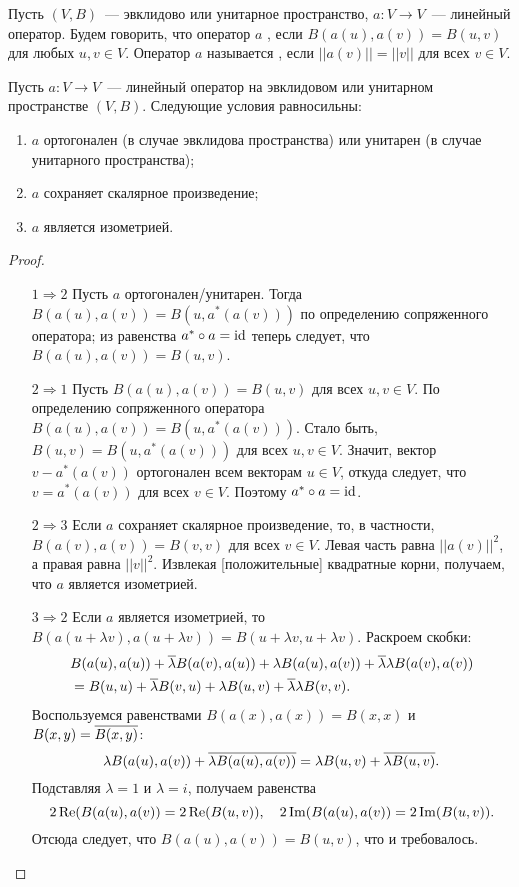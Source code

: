 \begin{definition}
Пусть $(V,B)$~--- эвклидово или унитарное пространство,
$a\colon V\to V$~--- линейный оператор.
Будем говорить, что оператор $a$ ,
если $B(a(u),a(v))=B(u,v)$ для любых $u,v\in V$.
Оператор $a$ называется , если
$||a(v)|| = ||v||$ для всех $v\in V$.
\end{definition}

\begin{lemma}\label{lem:isometry_equiv}
Пусть $a\colon V\to V$~--- линейный оператор на эвклидовом или
унитарном пространстве $(V,B)$. Следующие условия равносильны:
\begin{enumerate}
\item $a$ ортогонален (в случае эвклидова пространства) или унитарен
  (в случае унитарного пространства);
\item $a$ сохраняет скалярное произведение;
\item $a$ является изометрией.
\end{enumerate}
\end{lemma}
\begin{proof}
\begin{itemize}
\item[$1\Rightarrow 2$] Пусть $a$ ортогонален/унитарен. Тогда
  $B(a(u),a(v)) = B(u,a^*(a(v)))$ по определению сопряженного оператора;
  из равенства $a^*\circ a = \operatorname{id}$ теперь следует, что $B(a(u),a(v)) =
  B(u,v)$.
\item[$2\Rightarrow 1$] Пусть $B(a(u),a(v))= B(u,v)$ для всех $u,v\in
  V$. По определению сопряженного оператора $B(a(u),a(v)) =
  B(u,a^*(a(v)))$. Стало быть, $B(u,v) = B(u,a^*(a(v)))$ для всех
  $u,v\in V$.  Значит, вектор $v-a^*(a(v))$ ортогонален всем векторам $u\in V$,
  откуда следует, что  $v = a^*(a(v))$ для
  всех $v\in V$. Поэтому $a^*\circ a = \operatorname{id}$.
\item[$2\Rightarrow 3$] Если $a$ сохраняет скалярное произведение, то,
  в частности, $B(a(v),a(v)) = B(v,v)$ для всех $v\in V$. Левая часть
  равна $||a(v)||^2$, а правая равна $||v||^2$. Извлекая
  [положительные] квадратные корни, получаем, что $a$ является
  изометрией.
\item[$3\Rightarrow 2$] Если $a$ является изометрией, то
  $B(a(u+\lambda v),a(u+\lambda v)) = B(u+\lambda v,u+\lambda
  v)$. Раскроем скобки:
  \begin{align*}
  &B(a(u),a(u)) + \overline\lambda B(a(v),a(u)) + \lambda B(a(u),a(v)) +
  \overline\lambda\lambda B(a(v),a(v))\\ &= B(u,u) + \overline\lambda B(v,u) +
  \lambda B(u,v) + \overline\lambda\lambda B(v,v).
  \end{align*}
  Воспользуемся равенствами $B(a(x),a(x)) = B(x,x)$ и $B(x,y) =
  \overline{B(x,y)}$:
  $$
  \lambda B(a(u),a(v)) + \overline{\lambda B(a(u),a(v))} =
  \lambda B(u,v) + \overline{\lambda B(u,v)}.
  $$
  Подставляя $\lambda=1$ и $\lambda = i$, получаем равенства
  $$
  2\operatorname{Re}(B(a(u),a(v)) = 2\operatorname{Re}(B(u,v)), \quad
  2\operatorname{Im}(B(a(u),a(v)) = 2\operatorname{Im}(B(u,v)).
  $$
  Отсюда следует, что $B(a(u),a(v)) = B(u,v)$, что и требовалось.
\end{itemize}
\end{proof}

